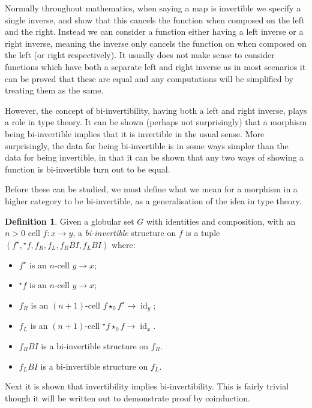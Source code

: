 \documentclass{article}
\theoremstyle{definition}
\newtheorem{definition}{Definition}
\theoremstyle{remark}
\DeclareMathOperator{\id}{id}
\newcommand{\linv}[1]{{}^\star\!#1}
\newcommand{\rinv}[1]{#1^\star}
\newcommand{\comp}{\star}
\begin{document}
Normally throughout mathematics, when saying a map is invertible we specify a single inverse, and show that this cancels the function when composed on the left and the right. Instead we can consider a function either having a left inverse or a right inverse, meaning the inverse only cancels the function on when composed on the left (or right respectively). It usually does not make sense to consider functions which have both a separate left and right inverse as in most scenarios it can be proved that these are equal and any computations will be simplified by treating them as the same.

However, the concept of bi-invertibility, having both a left and right inverse, plays a role in type theory. It can be shown (perhaps not surprisingly) that a morphism being bi-invertible implies that it is invertible in the usual sense. More surprisingly, the data for being bi-invertible is in some ways simpler than the data for being invertible, in that it can be shown that any two ways of showing a function is bi-invertible turn out to be equal.

Before these can be studied, we must define what we mean for a morphism in a higher category to be bi-invertible, as a generalisation of the idea in type theory.

\begin{definition}
  Given a globular set \(G\) with identities and composition, with an \(n > 0\) cell \(f : x \to y\), a \emph{bi-invertible} structure on \(f\) is a tuple \((\rinv f, \linv f, f_R, f_L, f_R{}BI, f_L{}BI)\) where:
  \begin{itemize}
  \item \(\rinv f\) is an \(n\)-cell \(y \to x\);
  \item \(\linv f\) is an \(n\)-cell \(y \to x\);
  \item \(f_R\) is an \((n+1)\)-cell \(f \comp_0 \rinv f \to \id_y\);
  \item \(f_L\) is an \((n+1)\)-cell \(\linv f \comp_0 f \to \id_x\).
  \item \(f_R{}BI\) is a bi-invertible structure on \(f_R\).
  \item \(f_L{}BI\) is a bi-invertible structure on \(f_L\).
  \end{itemize}
\end{definition}

Next it is shown that invertibility implies bi-invertibility. This is fairly trivial though it will be written out to demonstrate proof by coinduction.
\end{document}
